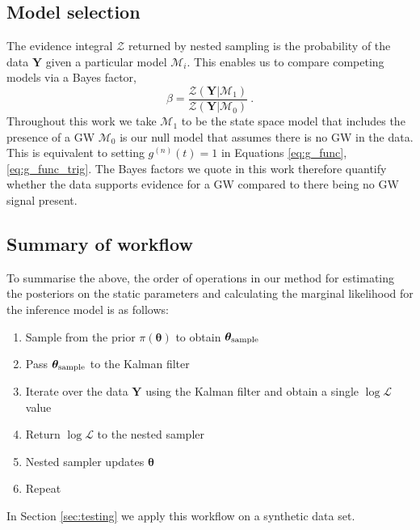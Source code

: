 \documentclass[fleqn,usenatbib,useAMS]{mnras}
\begin{document}

\subsection{Model selection}\label{sec:model_selection}
The evidence integral $\mathcal{Z}$ returned by nested sampling is the probability of the data $\boldsymbol{Y}$ given a particular model $\mathcal{M}_i$. This enables us to compare competing models via a Bayes factor,
\begin{equation}
	\beta = \frac{\mathcal{Z}(\boldsymbol{Y} | \mathcal{M}_1)}{\mathcal{Z}(\boldsymbol{Y} | \mathcal{M}_0)} \ . \label{eq:bayes}
\end{equation}
Throughout this work we take $\mathcal{M}_1$ to be the state space model that includes the presence of a GW $\mathcal{M}_0$ is our null model that assumes there is no GW in the data. This is equivalent to setting $g^{(n)}(t)=1$ in Equations \eqref{eq:g_func}, \eqref{eq:g_func_trig}. The Bayes factors we quote in this work therefore quantify whether the data supports evidence for a GW compared to there being no GW signal present.


\subsection{Summary of workflow}
To summarise the above, the order of operations in our method for estimating the posteriors on the static parameters and calculating the marginal likelihood for the inference model is as follows:

\begin{enumerate}
	\item Sample from the prior $\pi(\boldsymbol{\theta})$ to obtain $\boldsymbol{\theta}_{\rm sample}$
	\item Pass $\boldsymbol{\theta}_{\rm sample}$ to the Kalman filter
	\item Iterate over the data $\boldsymbol{Y}$ using the Kalman filter and obtain a single $\log \mathcal{L}$ value
	\item Return $\log \mathcal{L}$ to the nested sampler
	\item Nested sampler updates $\boldsymbol{\theta}$
	\item Repeat
\end{enumerate}
In Section \ref{sec:testing} we apply this workflow on a synthetic data set.
\end{document}

